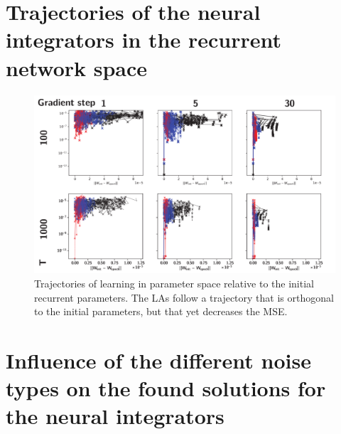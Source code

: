 \documentclass{article} %
\newcounter{ct}
\theoremstyle{definition}
\theoremstyle{remark}
\begin{document}
\newpage
\section{Trajectories of the neural integrators in the recurrent network space}

\begin{figure}[thbp]
     \centering
    \includegraphics[width=\textwidth]{wdn_mse_trajectories_F1}
       \caption{Trajectories of learning in parameter space relative to the initial recurrent parameters. The LAs follow a trajectory that is orthogonal to the initial parameters, but that yet decreases the MSE.}
         \label{fig:wdn_mse_trajectories_F1}
\end{figure}


\newpage
\section{Influence of the different noise types on the found solutions for the neural integrators}
\end{document}

